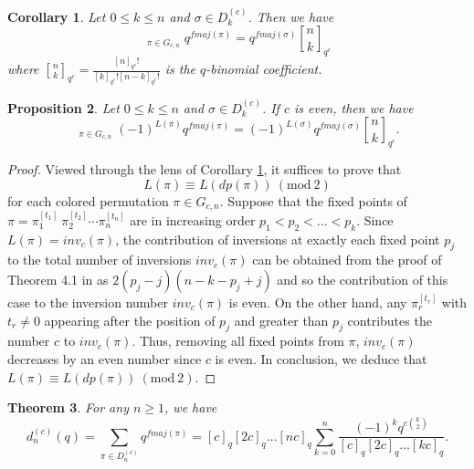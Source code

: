 \documentclass[a4paper,12pt]{article}
\newtheorem{thm}{Theorem}[section]
\newtheorem{prop}[thm]{Proposition}
\newtheorem{cor}[thm]{Corollary}
\begin{document}
\begin{cor}\label{cwac}
Let $0 \leq k \leq n$ and $\sigma \in D_{k}^{(c)}$. Then we have 
\begin{equation*}
\mathop{\sum_{dp(\pi)=\sigma}}_{\pi \in G_{c,n}}q^{fmaj(\pi)}=q^{fmaj(\sigma)} {n \brack k}_{q^c}
\end{equation*}
where ${n \brack k}_{q^c}=\frac{[n]_{q^c}!}{[k]_{q^c}![n-k]_{q^c}!}$ is the $q$-binomial coefficient.
\end{cor}


\begin{prop}\label{14}
Let $0 \leq k \leq n$ and $\sigma \in D_{k}^{(c)}$. If $c$ is even, then we have 
\begin{equation*}
\mathop{\sum_{dp(\pi)=\sigma}}_{\pi \in G_{c,n}}(-1)^{L(\pi)}q^{fmaj(\pi)}=(-1)^{L(\sigma)}q^{fmaj(\sigma)} {n \brack k}_{q^c}.
\end{equation*}
\end{prop}

\begin{proof}
Viewed through the lens of Corollary \ref{cwac}, it suffices to prove that
\begin{equation*}
L(\pi) \equiv L(dp(\pi)) ~(\textrm{mod}~2)
\end{equation*}
for each colored permutation $\pi \in G_{c,n}$. Suppose that the fixed points of $\pi=\pi_1^{[t_1]} ~\pi_2^{[t_2]} \cdots  \pi_n^{[t_n]}$ are in increasing order $p_1 < p_2 <\dots < p_k$. Since $L(\pi)=inv_c(\pi)$, the contribution of inversions at exactly each fixed point $p_j$ to the total number of inversions $inv_c(\pi)$ can be obtained from the proof of Theorem 4.1 in \cite{ahmia2025} as $2(p_j-j)(n-k-p_j+j)$ and so the contribution of this case to the inversion number $inv_c(\pi)$ is even. On the other hand, any $\pi_r^{[t_r]}$ with $t_r \neq 0$ appearing after the position of $p_j$ and greater than $p_j$ contributes the number $c$ to $inv_c(\pi)$.
Thus, removing all fixed points from $\pi$, $inv_c(\pi)$ decreases by an even number since $c$ is even. In conclusion, we deduce that $L(\pi) \equiv L(dp(\pi)) ~(\textrm{mod}~2)$.
\end{proof}

\begin{thm}\label{t5}
For any $n \geq 1$, we have
\begin{equation}\label{derpoly}
d_{n}^{(c)}(q)=\sum_{\pi \in D_{n}^{(c)}}q^{fmaj(\pi)}=[c]_q[2c]_q\dots [nc]_q \sum_{k=0}^n \frac{(-1)^k q^{c \binom{k}{2}}}{[c]_q[2c]_q\dots [kc]_q}.
\end{equation}
\end{thm}
\end{document}

